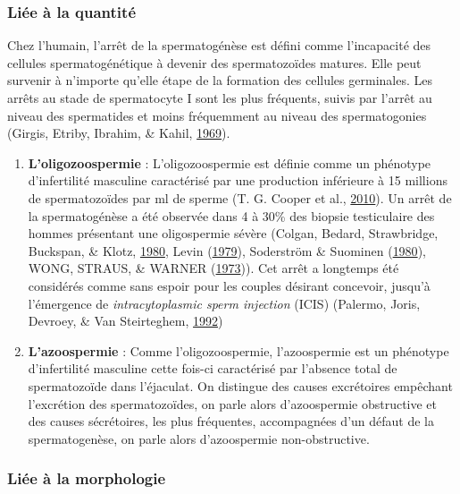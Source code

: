 \documentclass[12pt,twoside]{reedthesis}
\providecommand{\tightlist}{%
  \setlength{\itemsep}{0pt}\setlength{\parskip}{0pt}}
\theoremstyle{definition}
\theoremstyle{definition}
\theoremstyle{remark}
\begin{document}
  \subsubsection{Liée à la quantité}\label{liee-a-la-quantite}
  
  Chez l'humain, l'arrêt de la spermatogénèse est défini comme
  l'incapacité des cellules spermatogénétique à devenir des spermatozoïdes
  matures. Elle peut survenir à n'importe qu'elle étape de la formation
  des cellules germinales. Les arrêts au stade de spermatocyte I sont les
  plus fréquents, suivis par l'arrêt au niveau des spermatides et moins
  fréquemment au niveau des spermatogonies (Girgis, Etriby, Ibrahim, \&
  Kahil, \protect\hyperlink{ref-Girgis}{1969}).
  
  \begin{enumerate}
  \def\labelenumi{\arabic{enumi}.}
  \tightlist
  \item
    \textbf{L'oligozoospermie} : L'oligozoospermie est définie comme un
    phénotype d'infertilité masculine caractérisé par une production
    inférieure à 15 millions de spermatozoïdes par ml de sperme (T. G.
    Cooper et al., \protect\hyperlink{ref-Cooper2010}{2010}). Un arrêt de
    la spermatogénèse a été observée dans 4 à 30\% des biopsie
    testiculaire des hommes présentant une oligospermie sévère (Colgan,
    Bedard, Strawbridge, Buckspan, \& Klotz,
    \protect\hyperlink{ref-Colgan1980}{1980}, Levin
    (\protect\hyperlink{ref-Levin1979}{1979}), Soderström \& Suominen
    (\protect\hyperlink{ref-Soderstrom1980}{1980}), WONG, STRAUS, \&
    WARNER (\protect\hyperlink{ref-WONG1973}{1973})). Cet arrêt a
    longtemps été considérés comme sans espoir pour les couples désirant
    concevoir, jusqu'à l'émergence de \emph{intracytoplasmic sperm
    injection} (ICIS) (Palermo, Joris, Devroey, \& Van Steirteghem,
    \protect\hyperlink{ref-Palermo1992}{1992})\\
  \item
    \textbf{L'azoospermie} : Comme l'oligozoospermie, l'azoospermie est un
    phénotype d'infertilité masculine cette fois-ci caractérisé par
    l'absence total de spermatozoïde dans l'éjaculat. On distingue des
    causes excrétoires empêchant l'excrétion des spermatozoïdes, on parle
    alors d'azoospermie obstructive et des causes sécrétoires, les plus
    fréquentes, accompagnées d'un défaut de la spermatogenèse, on parle
    alors d'azoospermie non-obstructive.
  \end{enumerate}
  
  \subsubsection{Liée à la morphologie}\label{liee-a-la-morphologie}
  
\end{document}
